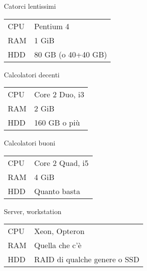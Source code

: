\documentclass[a4paper,11pt,twoside]{article}
\newcommand{\titoletto}[1]{\begin{centering}{\small #1\par}\end{centering}\vspace{1em}}
\begin{document}
\pagestyle{empty}
\begin{minipage}{.32\textwidth}
	\begin{framed}
		\titoletto{Catorci lentissimi}
		\begin{tabular}{l p{3cm}}
			CPU & Pentium 4\\
			RAM & 1 GiB\\
			HDD & 80 GB \newline (o 40+40 GB)\\
		\end{tabular}
	\end{framed}
\end{minipage}%
\hfill
\begin{minipage}{.32\textwidth}
	\begin{framed}
		\titoletto{Calcolatori decenti}
		\begin{tabular}{l p{3cm}}
			CPU & Core 2 Duo, i3\\
			RAM & 2 GiB\\
			HDD & 160 GB o pi\`u\newline \\
		\end{tabular}
	\end{framed}
\end{minipage}%
\hfill
\begin{minipage}{.32\textwidth}
	\begin{framed}
		\titoletto{Calcolatori buoni}
		\begin{tabular}{l p{3cm}}
			CPU & Core 2 Quad, i5\\
			RAM & 4 GiB\\
			HDD & Quanto basta\newline \\
		\end{tabular}
	\end{framed}
\end{minipage}%
\vspace{.016\textwidth}
\begin{minipage}{.32\textwidth}
	\begin{framed}
		\titoletto{Server, workstation}
		\begin{tabular}{l p{3cm}}
			CPU & Xeon, Opteron\\
			RAM & Quella che c'\`e\\
			HDD & RAID di qualche genere o SSD\newline \\
		\end{tabular}
	\end{framed}
\end{minipage}
\end{document}

